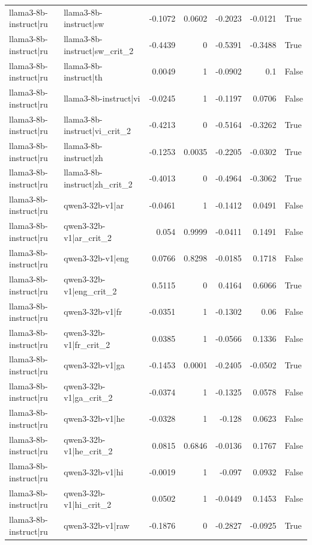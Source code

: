\begin{table}
\begin{tabular}{l l r r r r l}
llama3-8b-instruct|ru & llama3-8b-instruct|sw & -0.1072 & 0.0602 & -0.2023 & -0.0121 & True \\
llama3-8b-instruct|ru & llama3-8b-instruct|sw_crit_2 & -0.4439 & 0 & -0.5391 & -0.3488 & True \\
llama3-8b-instruct|ru & llama3-8b-instruct|th & 0.0049 & 1 & -0.0902 & 0.1 & False \\
llama3-8b-instruct|ru & llama3-8b-instruct|vi & -0.0245 & 1 & -0.1197 & 0.0706 & False \\
llama3-8b-instruct|ru & llama3-8b-instruct|vi_crit_2 & -0.4213 & 0 & -0.5164 & -0.3262 & True \\
llama3-8b-instruct|ru & llama3-8b-instruct|zh & -0.1253 & 0.0035 & -0.2205 & -0.0302 & True \\
llama3-8b-instruct|ru & llama3-8b-instruct|zh_crit_2 & -0.4013 & 0 & -0.4964 & -0.3062 & True \\
llama3-8b-instruct|ru & qwen3-32b-v1|ar & -0.0461 & 1 & -0.1412 & 0.0491 & False \\
llama3-8b-instruct|ru & qwen3-32b-v1|ar_crit_2 & 0.054 & 0.9999 & -0.0411 & 0.1491 & False \\
llama3-8b-instruct|ru & qwen3-32b-v1|eng & 0.0766 & 0.8298 & -0.0185 & 0.1718 & False \\
llama3-8b-instruct|ru & qwen3-32b-v1|eng_crit_2 & 0.5115 & 0 & 0.4164 & 0.6066 & True \\
llama3-8b-instruct|ru & qwen3-32b-v1|fr & -0.0351 & 1 & -0.1302 & 0.06 & False \\
llama3-8b-instruct|ru & qwen3-32b-v1|fr_crit_2 & 0.0385 & 1 & -0.0566 & 0.1336 & False \\
llama3-8b-instruct|ru & qwen3-32b-v1|ga & -0.1453 & 0.0001 & -0.2405 & -0.0502 & True \\
llama3-8b-instruct|ru & qwen3-32b-v1|ga_crit_2 & -0.0374 & 1 & -0.1325 & 0.0578 & False \\
llama3-8b-instruct|ru & qwen3-32b-v1|he & -0.0328 & 1 & -0.128 & 0.0623 & False \\
llama3-8b-instruct|ru & qwen3-32b-v1|he_crit_2 & 0.0815 & 0.6846 & -0.0136 & 0.1767 & False \\
llama3-8b-instruct|ru & qwen3-32b-v1|hi & -0.0019 & 1 & -0.097 & 0.0932 & False \\
llama3-8b-instruct|ru & qwen3-32b-v1|hi_crit_2 & 0.0502 & 1 & -0.0449 & 0.1453 & False \\
llama3-8b-instruct|ru & qwen3-32b-v1|raw & -0.1876 & 0 & -0.2827 & -0.0925 & True \\

\end{tabular}
\end{table}
